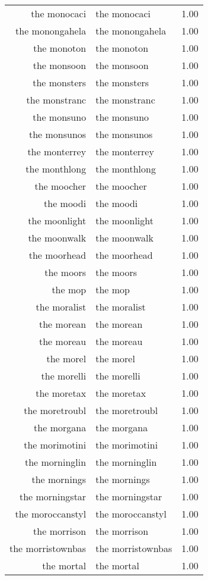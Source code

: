 \begin{table}[ht]
\begin{tabular}{rlr}
  the monocaci & the monocaci & 1.00 \\ 
  the monongahela & the monongahela & 1.00 \\ 
  the monoton & the monoton & 1.00 \\ 
  the monsoon & the monsoon & 1.00 \\ 
  the monsters & the monsters & 1.00 \\ 
  the monstranc & the monstranc & 1.00 \\ 
  the monsuno & the monsuno & 1.00 \\ 
  the monsunos & the monsunos & 1.00 \\ 
  the monterrey & the monterrey & 1.00 \\ 
  the monthlong & the monthlong & 1.00 \\ 
  the moocher & the moocher & 1.00 \\ 
  the moodi & the moodi & 1.00 \\ 
  the moonlight & the moonlight & 1.00 \\ 
  the moonwalk & the moonwalk & 1.00 \\ 
  the moorhead & the moorhead & 1.00 \\ 
  the moors & the moors & 1.00 \\ 
  the mop & the mop & 1.00 \\ 
  the moralist & the moralist & 1.00 \\ 
  the morean & the morean & 1.00 \\ 
  the moreau & the moreau & 1.00 \\ 
  the morel & the morel & 1.00 \\ 
  the morelli & the morelli & 1.00 \\ 
  the moretax & the moretax & 1.00 \\ 
  the moretroubl & the moretroubl & 1.00 \\ 
  the morgana & the morgana & 1.00 \\ 
  the morimotini & the morimotini & 1.00 \\ 
  the morninglin & the morninglin & 1.00 \\ 
  the mornings & the mornings & 1.00 \\ 
  the morningstar & the morningstar & 1.00 \\ 
  the moroccanstyl & the moroccanstyl & 1.00 \\ 
  the morrison & the morrison & 1.00 \\ 
  the morristownbas & the morristownbas & 1.00 \\ 
  the mortal & the mortal & 1.00 \\ 

\end{tabular}
\end{table}

